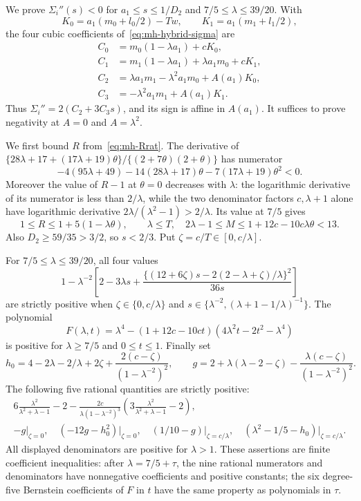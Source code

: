 We prove $\Sigma_i''(s)<0$ for $a_1\le s\le1/D_2$ and $7/5\le\lambda\le39/20$. With
\[
 K_0=a_1(m_0+l_0/2)-Tw,\qquad K_1=a_1(m_1+l_1/2),
\]
the four cubic coefficients of~\eqref{eq:mh-hybrid-sigma} are
\begin{align*}
 C_0&=m_0(1-\lambda a_1)+cK_0,\\
 C_1&=m_1(1-\lambda a_1)+\lambda a_1m_0+cK_1,\\
 C_2&=\lambda a_1m_1-\lambda^2a_1m_0+A(a_1)K_0,\\
 C_3&=-\lambda^2a_1m_1+A(a_1)K_1.
\end{align*}
Thus $\Sigma_i''=2(C_2+3C_3s)$, and its sign is affine in $A(a_1)$. It suffices to prove negativity at $A=0$ and $A=\lambda^2$.

We first bound $R$ from~\eqref{eq:mh-Rrat}. The derivative of
$\{28\lambda+17+(17\lambda+19)\theta\}/\{(2+7\theta)(2+\theta)\}$ has numerator
\[
 -4(95\lambda+49)-14(28\lambda+17)\theta
                    -7(17\lambda+19)\theta^2<0.
\]
Moreover the value of $R-1$ at $\theta=0$ decreases with $\lambda$: the logarithmic derivative of its numerator is less than $2/\lambda$, while the two denominator factors $c,\lambda+1$ alone have logarithmic derivative $2\lambda/(\lambda^2-1)>2/\lambda$. Its value at $7/5$ gives
\begin{equation}\label{eq:mh-price-bounds}
 1\le R\le1+5(1-\lambda\theta),\qquad
 \lambda\le T,\quad 2\lambda-1\le M\le1+12c-10c\lambda\theta<13.
\end{equation}
Also $D_2\ge59/35>3/2$, so $s<2/3$. Put $\zeta=c/T\in[0,c/\lambda]$.

\begin{lemma}\label{lem:mh-curvature-arithmetic}
For $7/5\le\lambda\le39/20$, all four values
\[
 1-\lambda^{-2}\left[2-3\lambda s+
 \frac{\{(12+6\zeta)s-2(2-\lambda+\zeta)/\lambda\}^2}{36s}\right]
\]
are strictly positive when $\zeta\in\{0,c/\lambda\}$ and
$s\in\{\lambda^{-2},(\lambda+1-1/\lambda)^{-1}\}$.
The polynomial
\[
 F(\lambda,t)=\lambda^4-(1+12c-10ct)(4\lambda^2t-2t^2-\lambda^4)
\]
is positive for $\lambda\ge7/5$ and $0\le t\le1$.
Finally set
\[
 h_0=4-2\lambda-2/\lambda+2\zeta+
        \frac{2(c-\zeta)}{(1-\lambda^{-2})^2},\qquad
 g=2+\lambda(\lambda-2-\zeta)
       -\frac{\lambda(c-\zeta)}{(1-\lambda^{-2})^2}.
\]
The following five rational quantities are strictly positive:
\begin{gather*}
 6\frac{\lambda^2}{\lambda^2+\lambda-1}-2
 -\frac{2c}{\lambda(1-\lambda^{-2})^3}
       \left(3\frac{\lambda^2}{\lambda^2+\lambda-1}-2\right),\\
 -g\big|_{\zeta=0},\quad
 (-12g-h_0^2)\big|_{\zeta=0},\quad
 (1/10-g)\big|_{\zeta=c/\lambda},\quad
 (\lambda^2-1/5-h_0)\big|_{\zeta=c/\lambda}.
\end{gather*}
All displayed denominators are positive for $\lambda>1$. These assertions are finite coefficient inequalities: after $\lambda=7/5+\tau$, the nine rational numerators and denominators have nonnegative coefficients and positive constants; the six degree-five Bernstein coefficients of $F$ in $t$ have the same property as polynomials in $\tau$.
\end{lemma}

